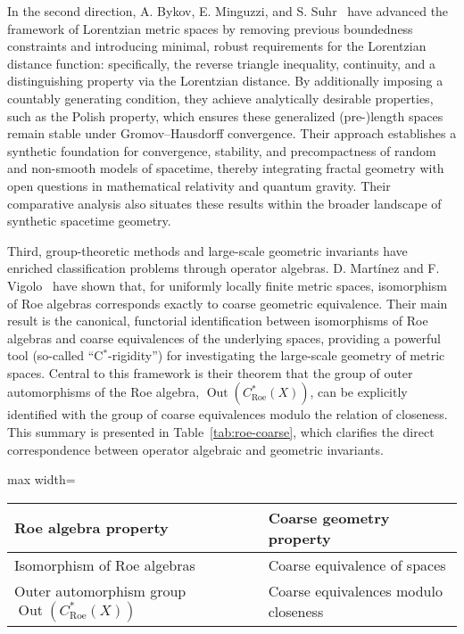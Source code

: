 \documentclass[sigconf]{acmart}
\begin{document}
In the second direction, A. Bykov, E. Minguzzi, and S. Suhr~\cite{ref51} have advanced the framework of Lorentzian metric spaces by removing previous boundedness constraints and introducing minimal, robust requirements for the Lorentzian distance function: specifically, the reverse triangle inequality, continuity, and a distinguishing property via the Lorentzian distance. By additionally imposing a countably generating condition, they achieve analytically desirable properties, such as the Polish property, which ensures these generalized (pre-)length spaces remain stable under Gromov--Hausdorff convergence. Their approach establishes a synthetic foundation for convergence, stability, and precompactness of random and non-smooth models of spacetime, thereby integrating fractal geometry with open questions in mathematical relativity and quantum gravity. Their comparative analysis also situates these results within the broader landscape of synthetic spacetime geometry.

Third, group-theoretic methods and large-scale geometric invariants have enriched classification problems through operator algebras. D. Martínez and F. Vigolo~\cite{ref52} have shown that, for uniformly locally finite metric spaces, isomorphism of Roe algebras corresponds exactly to coarse geometric equivalence. Their main result is the canonical, functorial identification between isomorphisms of Roe algebras and coarse equivalences of the underlying spaces, providing a powerful tool (so-called ``C$^*$-rigidity'') for investigating the large-scale geometry of metric spaces. Central to this framework is their theorem that the group of outer automorphisms of the Roe algebra, $\operatorname{Out}(C^*_{\mathrm{Roe}}(X))$, can be explicitly identified with the group of coarse equivalences modulo the relation of closeness. This summary is presented in Table~\ref{tab:roe-coarse}, which clarifies the direct correspondence between operator algebraic and geometric invariants.

\begin{table*}[htbp]
\centering
\caption{Correspondence between Roe algebra and coarse geometric equivalence, as established by Martínez and Vigolo~\cite{ref52}}
\label{tab:roe-coarse}
\begin{adjustbox}{max width=\textwidth}
\begin{tabular}{@{}ll@{}}
\toprule
Roe algebra property & Coarse geometry property \\
\midrule
Isomorphism of Roe algebras & Coarse equivalence of spaces \\
Outer automorphism group $\operatorname{Out}(C^*_{\mathrm{Roe}}(X))$ & Coarse equivalences modulo closeness \\
\bottomrule
\end{tabular}
\end{adjustbox}
\end{table*}
\end{document}
